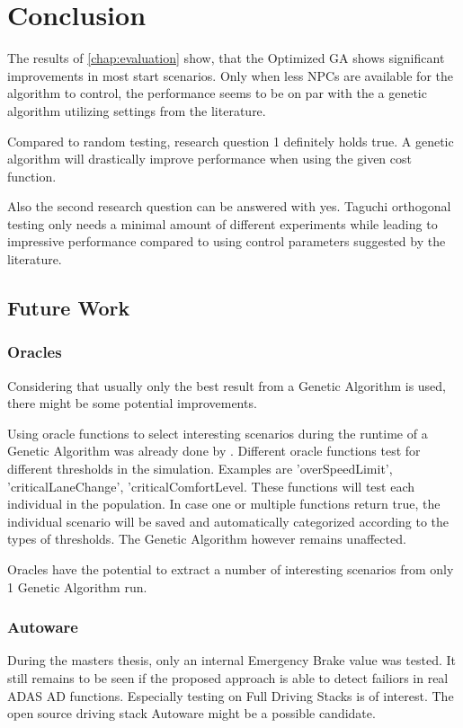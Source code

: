 \chapter{Conclusion}

The results of \ref{chap:evaluation} show, that the Optimized GA shows significant improvements in most start scenarios. Only when less NPCs are available for the algorithm to control, the performance seems to be on par with the a genetic algorithm utilizing settings from the literature.

Compared to random testing, research question 1 definitely holds true. A genetic algorithm will drastically improve performance when using the given cost function.

Also the second research question can be answered with yes. Taguchi orthogonal testing only needs a minimal amount of different experiments while leading to impressive performance compared to using control parameters suggested by the literature.

\section{Future Work}
\subsection{Oracles}
Considering that usually only the best result from a Genetic Algorithm is used, there might be some potential improvements.

Using oracle functions to select interesting scenarios during the runtime of a Genetic Algorithm was already done by \cite{almanee_scenorita_2021}. Different oracle functions test for different thresholds in the simulation. Examples are 'overSpeedLimit', 'criticalLaneChange', 'criticalComfortLevel. These functions will test each individual in the population. In case one or multiple functions return true, the individual scenario will be saved and automatically categorized according to the types of thresholds. The Genetic Algorithm however remains unaffected.

Oracles have the potential to extract a number of interesting scenarios from only 1 Genetic Algorithm run.

\subsection{Autoware}
During the masters thesis, only an internal Emergency Brake value was tested. It still remains to be seen if the proposed approach is able to detect failiors in real ADAS AD functions. Especially testing on Full Driving Stacks is of interest. The open source driving stack Autoware might be a possible candidate.